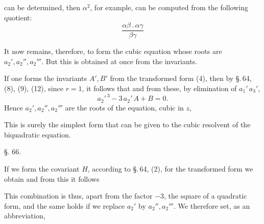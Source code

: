 can be determined, then $\alpha^2$, for example, can be computed from the following quotient:
\[
\frac{\alpha\beta\,.\,\alpha\gamma}{\beta\gamma}
\]

It now remains, therefore, to form the cubic equation whose
roots are $a_2', a_2'', a_2'''$. But this is obtained at once from
the invariants.

If one forms the invariants $A', B'$ from the transformed
form (4), then by §.\,64, (8), (9), (12), since $r = 1$, it follows that
and from these, by elimination of $a_1'\,a_3'$,
\[
a_2'^{\,3} - 3\,a_2'\,A + B = 0.
\]
Hence $a_2', a_2'', a_2'''$ are the roots of the equation, cubic in $z$,

This is surely the simplest form that can be given to the cubic
resolvent of the biquadratic equation.

\begin{center}
§. 66.

\end{center}

If we form the covariant $H$, according to §.\,64, (2), for the transformed
 form
we obtain
and from this it follows

This combination is thus, apart from the factor $-3$, the
square of a quadratic form, and the same holds if we replace
$a_2'$ by $a_2'', a_2'''$. We therefore set, as an
abbreviation,
